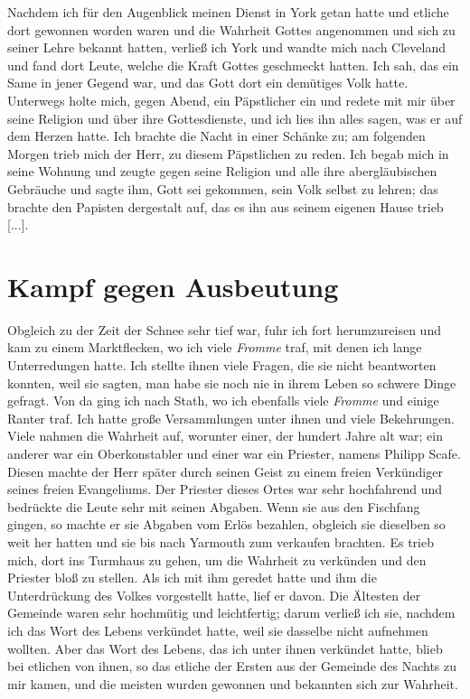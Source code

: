 Nachdem ich für den Augenblick meinen Dienst in York getan
hatte und etliche dort gewonnen worden waren und die Wahrheit
Gottes angenommen und sich zu seiner Lehre bekannt hatten,
verließ ich York und wandte mich nach 
Cleveland und fand dort
Leute, welche die Kraft Gottes geschmeckt hatten. Ich sah, das
ein Same in jener Gegend war, und das Gott dort ein demütiges
Volk hatte. Unterwegs holte mich, gegen Abend, ein Päpstlicher
ein und redete mit mir über seine Religion und über ihre 
Gottesdienste, und ich lies ihn alles sagen, was er auf dem Herzen
hatte. Ich brachte die Nacht in einer Schänke zu; am folgenden
Morgen trieb mich der Herr, zu diesem 
Päpstlichen zu reden. Ich
begab mich in seine Wohnung und zeugte gegen seine Religion
und alle ihre abergläubischen Gebräuche und sagte ihm, Gott sei
gekommen, sein Volk selbst zu lehren; das brachte den Papisten
dergestalt auf, das es ihn aus seinem eigenen Hause trieb [...].

\section{Kampf gegen Ausbeutung}

Obgleich zu der Zeit der Schnee sehr tief war, fuhr ich fort
herumzureisen und kam zu einem Marktflecken, wo ich viele
\textit{Fromme} traf, mit denen ich lange Unterredungen hatte. Ich
stellte ihnen viele Fragen, die sie nicht beantworten konnten, weil
sie sagten, man habe sie noch nie in ihrem Leben so schwere
Dinge gefragt. Von da ging ich nach Stath, wo ich ebenfalls
viele \textit{Fromme} und einige Ranter traf. 
Ich hatte große Versammlungen unter ihnen und viele Bekehrungen. 
Viele nahmen die Wahrheit auf, worunter einer, der hundert 
Jahre alt war; ein
anderer war ein Oberkonstabler und einer war ein Priester, namens
Philipp Scafe. Diesen machte der Herr 
später durch seinen Geist
zu einem freien Verkündiger seines freien Evangeliums.
Der Priester dieses Ortes war sehr hochfahrend und bedrückte
die Leute sehr mit seinen Abgaben. 
Wenn sie aus den Fischfang
gingen, so machte er sie Abgaben vom Erlös bezahlen, obgleich
sie dieselben so weit her hatten und sie bis nach Yarmouth zum
verkaufen brachten. Es trieb mich, dort ins Turmhaus zu gehen,
um die Wahrheit zu verkünden und den Priester bloß zu stellen.
Als ich mit ihm geredet hatte und ihm die Unterdrückung des
Volkes vorgestellt hatte, lief er davon. Die Ältesten der Gemeinde
waren sehr hochmütig und leichtfertig; darum verließ ich sie, 
nachdem ich das Wort des Lebens verkündet hatte, weil sie dasselbe
nicht aufnehmen wollten. Aber das Wort des Lebens, das ich
unter ihnen verkündet hatte, blieb bei etlichen von ihnen, so das
etliche der Ersten aus der Gemeinde des Nachts zu mir kamen,
und die meisten wurden gewonnen und bekannten sich zur Wahrheit.


